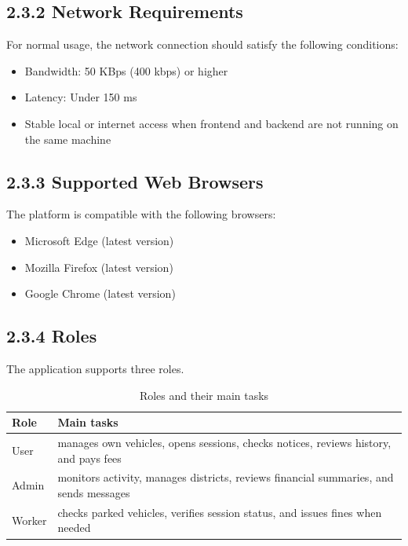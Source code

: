 \documentclass[12pt,a4paper,oneside]{report}
\begin{document}
\subsection*{2.3.2 Network Requirements}
For normal usage, the network connection should satisfy the following conditions:
\begin{itemize}[leftmargin=2em,noitemsep,topsep=2pt]
    \item Bandwidth: 50 KBps (400 kbps) or higher
    \item Latency: Under 150 ms
    \item Stable local or internet access when frontend and backend are not running on the same machine
\end{itemize}

\subsection*{2.3.3 Supported Web Browsers}
The platform is compatible with the following browsers:
\begin{itemize}[leftmargin=2em,noitemsep,topsep=2pt]
    \item Microsoft Edge (latest version)
    \item Mozilla Firefox (latest version)
    \item Google Chrome (latest version)
\end{itemize}

\subsection*{2.3.4 Roles}

The application supports three roles.

\begin{table}[H]
\centering
\caption{Roles and their main tasks}
\label{tab:user-roles}
\begin{tabularx}{\textwidth}{@{}l X@{}}
\toprule
\textbf{Role} & \textbf{Main tasks} \\
\midrule
User & manages own vehicles, opens sessions, checks notices, reviews history, and pays fees \\
Admin & monitors activity, manages districts, reviews financial summaries, and sends messages \\
Worker & checks parked vehicles, verifies session status, and issues fines when needed \\
\bottomrule
\end{tabularx}
\end{table}
\end{document}
